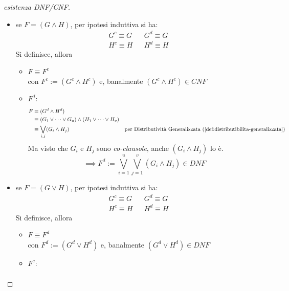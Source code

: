 \begin{proof}[esistenza DNF/CNF]
\begin{itemize}
\begin{itemize}
\begin{align*}
                               & \equiv \bar{\ell}_{i_1} \lor \cdots \lor \bar{\ell}_{i_{v_i}} & \neg \ell_{i_j} \text{ è } \equiv \text{ a un letterale opposto} \\
          \implies (\neg G)^c \in CNF 
        \end{align*}
        Quindi esistono sia $F^d := (\neg G)^d \equiv \neg (G^c)$ che $F^c := (\neg G)^c \equiv \neg (G^d)$. 
      \item se $F = (G \land H)$, per ipotesi induttiva si ha:
        \begin{align*}
           G^c \equiv G && G^d \equiv G \\
           H^c \equiv H && H^d \equiv H
        \end{align*}
        Si definisce, allora
        \begin{itemize}
          \item $F \equiv F^c$ \\
                con $F^c := (G^c \land H^c)$ e, banalmente $(G^c \land H^c) \in CNF$
          \item $F^d$:
            \begin{align*}
              F & \equiv (G^d \land H^d) \\ 
                & \equiv (G_1 \lor \cdots \lor G_u) \land (H_1 \lor \cdots \lor H_v) \\
                & \equiv \bigvee\limits_{i,j}(G_i \land H_j) & \text{per Distributività Generalizzata}~(\ref{def:distributibilita-generalizzata})
            \end{align*}
            Ma visto che $G_i$ e $H_j$ sono \textit{co-clausole}, anche $(G_i \land H_j)$ lo è.
            $$
            \implies F^d := \bigvee\limits_{i=1}^u \bigvee\limits_{j=1}^v (G_i \land H_j) \in DNF
            $$
        \end{itemize}
      \item se $F = (G \lor H)$, per ipotesi induttiva si ha:
        \begin{align*}
          G^c \equiv G && G^d \equiv G \\
          H^c \equiv H && H^d \equiv H
        \end{align*}
        Si definisce, allora
        \begin{itemize}
          \item $F \equiv F^d$ \\
                con $F^d := (G^d \lor H^d)$ e, banalmente $(G^d \lor H^d) \in DNF$
          \item $F^c$:
            \begin{align*}

\end{align*}
\end{itemize}
\end{itemize}
\end{itemize}
\end{proof}

